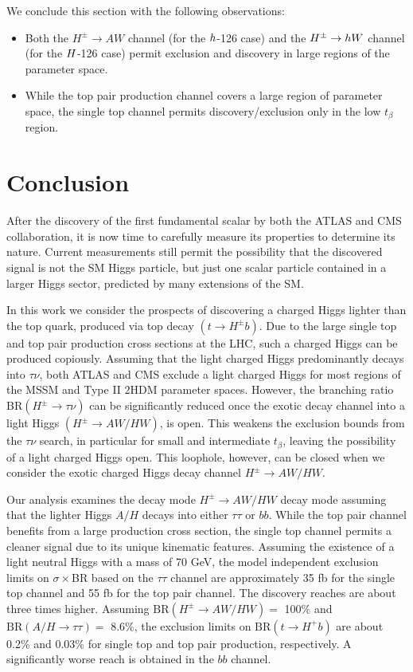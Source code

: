 We conclude this section with the following observations: 
\begin{itemize}
\item Both the $H^{\pm} \rightarrow A W$ channel (for the $h$-126 case) and the $H^{\pm} \rightarrow h W$ channel (for the $H$-126 case) permit exclusion and discovery in large regions of the parameter space.

\item While the top pair production channel covers a large region of parameter space, the single top channel permits discovery/exclusion only in the low $t_{\beta}$ region.  
\end{itemize} 

\section{Conclusion}
\label{sec:light_charged_conclusion}
After the discovery of the first fundamental scalar by both the ATLAS and CMS collaboration, it is now time to carefully measure its properties to determine its nature. Current measurements still permit the possibility that the discovered signal is not the SM Higgs particle, but just one scalar particle contained in a larger Higgs sector, predicted by many extensions of the SM.

In this work we consider the prospects of discovering a charged Higgs lighter than the top quark, produced via top decay $(t \rightarrow H^{\pm} b)$. Due to the large single top and top pair production cross sections at the LHC, such a charged Higgs can be produced copiously. Assuming that the light charged Higgs predominantly decays into $\tau\nu$, both ATLAS and CMS exclude a light charged Higgs for most regions of the MSSM and Type II $2$HDM parameter spaces. However, the branching ratio BR$(H^{\pm} \rightarrow \tau\nu)$ can be significantly reduced once the exotic decay channel into a light Higgs $(H^{\pm} \rightarrow AW/HW)$, is open. This weakens the exclusion bounds from the $\tau\nu$ search, in particular for small and intermediate $t_{\beta}$, leaving the possibility of a light charged Higgs open. This loophole, however, can be closed when we consider the exotic charged Higgs decay channel $H^\pm \to AW/HW$.

Our analysis examines the decay mode $H^{\pm} \rightarrow AW/HW$ decay mode assuming that the lighter Higgs $A/H$ decays into either $\tau\tau$ or $bb$. While the top pair channel benefits from a large production cross section, the single top channel permits a cleaner signal due to its unique kinematic features. Assuming the existence of a light neutral Higgs with a mass of 70 GeV, the model independent exclusion limits on $\sigma\times$BR based on the $\tau\tau$ channel are approximately 35 fb for the single top channel and 55 fb for the top pair channel. The discovery reaches are about three times higher. Assuming $\text{BR}(H^{\pm} \rightarrow AW/HW)=$ 100\% and $\text{BR}(A/H \rightarrow \tau\tau)=$ 8.6\%, the exclusion limits on $\text{BR}(t \rightarrow H^+ b)$ are about 0.2\% and 0.03\% for single top and top pair production, respectively. A significantly worse reach is obtained in the $bb$ channel. 

